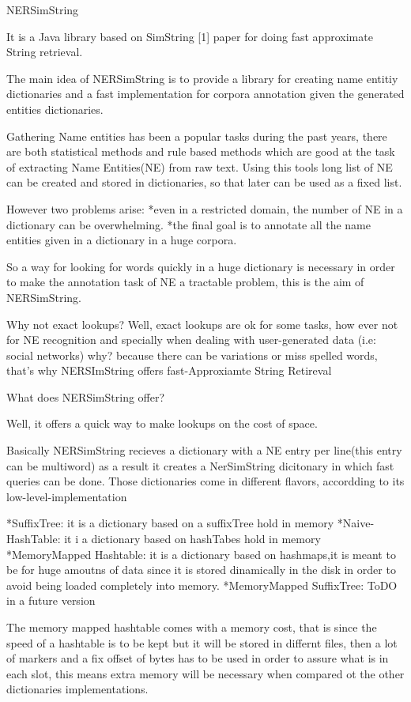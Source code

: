 NERSimString 

It is a Java library based on SimString [1] paper for doing fast approximate String retrieval.

The main idea of NERSimString is to provide a library for creating name entitiy dictionaries
and a fast implementation for corpora annotation given the generated entities dictionaries.

Gathering Name entities has been a popular tasks during the past years,
 there are  both statistical methods and rule based methods which are good at the task of extracting Name Entities(NE)
from raw text.
Using this tools long list of NE can be created and stored in dictionaries, so that later can be used as a fixed list.

However two problems arise:
 *even in a restricted domain, the number of NE in a dictionary can be overwhelming.
 *the final goal is to annotate all the name entities given in a dictionary in  a huge corpora.

So a way for looking for words quickly in a huge dictionary is  necessary in order to make the annotation task of NE a tractable problem, 
this is the aim of NERSimString.

Why not exact lookups?
Well, exact lookups are ok for some tasks, how ever not for NE recognition and specially when dealing
with user-generated data (i.e: social networks) why? because there can be variations or miss spelled words,
that's why NERSImString offers fast-Approxiamte String Retireval

What does NERSimString offer?

Well, it offers a quick way to make lookups on the cost of space.

Basically NERSimString recieves a dictionary with a NE entry per line(this entry can be multiword)
as a result it creates a NerSimString dicitonary in which fast queries can be done.
Those dictionaries come in different flavors, accordding to its low-level-implementation


	*SuffixTree: it is a dictionary based on a suffixTree hold in memory
	*Naive-HashTable: it i a dictionary based on hashTabes hold in memory
	*MemoryMapped Hashtable: it is a dictionary based on hashmaps,it is meant to be for huge amoutns of data since it is stored dinamically in the disk
				 in order to avoid being loaded completely into memory.
	*MemoryMapped SuffixTree: ToDO in a future version

The memory mapped hashtable comes with a memory cost, that is since the speed of  a hashtable is to be kept but it will be stored in differnt files, then a lot of markers and a fix offset of bytes has to be used in order to assure what is in each slot, this means extra memory will be necessary when compared ot the other dictionaries implementations.

